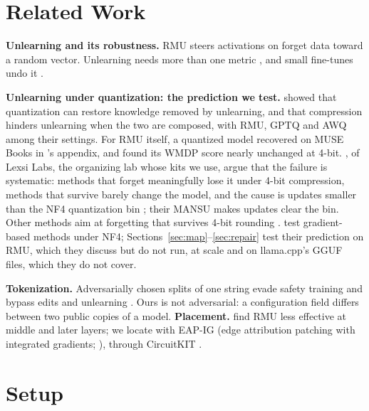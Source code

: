 \documentclass[11pt]{article}
\newcommand{\nf}{\textsc{NF4}}
\begin{document}
\section{Related Work}

\textbf{Unlearning and its robustness.} RMU \citep{li2024wmdp} steers activations on forget data toward a random vector. Unlearning needs more than one metric \citep{lynch2024eight}, and small fine-tunes undo it \citep{lucki2024adversarial,deeb2024unlearning,hu2025jogging}.

\textbf{Unlearning under quantization: the prediction we test.} \citet{zhang2025quantization} showed that quantization can restore knowledge removed by unlearning, and \citet{kolbeinsson2025composable} that compression hinders unlearning when the two are composed, with RMU, GPTQ \citep{frantar2023gptq} and AWQ \citep{lin2024awq} among their settings. For RMU itself, a quantized model recovered on MUSE Books \citep{shi2024muse} in \citeauthor{zhang2025quantization}'s appendix, and \citet{fan2025microscope} found its WMDP score nearly unchanged at 4-bit. \citet{sadhu2026forgetting}, of Lexsi Labs, the organizing lab whose kits we use, argue that the failure is systematic: methods that forget meaningfully lose it under 4-bit compression, methods that survive barely change the model, and the cause is updates smaller than the \nf{} quantization bin \citep{dettmers2023qlora}; their MANSU makes updates clear the bin. Other methods aim at forgetting that survives 4-bit rounding \citep{khan2026durableun,abitante2026quantization,ranjan2026forgetting}. \citeauthor{sadhu2026forgetting} test gradient-based methods under \nf{}; Sections~\ref{sec:map}--\ref{sec:repair} test their prediction on RMU, which they discuss but do not run, at scale and on llama.cpp's GGUF files, which they do not cover.

\textbf{Tokenization.} Adversarially chosen splits of one string evade safety training \citep{geh2025adversarial} and bypass edits and unlearning \citep{baser2026tokens}. Ours is not adversarial: a configuration field differs between two public copies of a model. \textbf{Placement.} \citet{dang2025effects} find RMU less effective at middle and later layers; we locate with EAP-IG (edge attribution patching with integrated gradients; \citealp{hanna2024faith}), through CircuitKIT \citep{seth2026circuitkit}.

\section{Setup}
\label{sec:setup}
\end{document}
